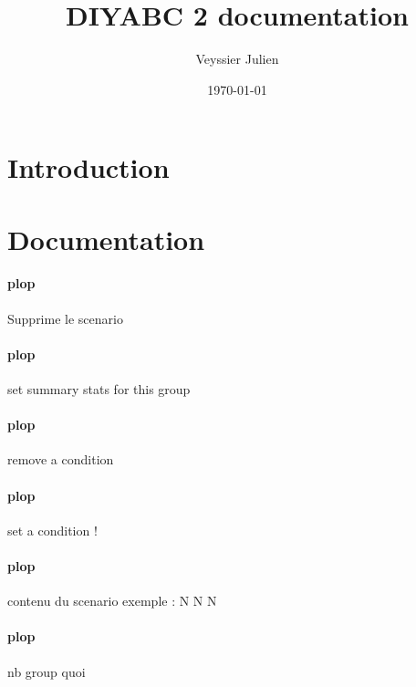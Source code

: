 \documentclass[12pt,a4paper]{article}
\author{Veyssier Julien}
\title{DIYABC 2 documentation}
\date\today
\begin{document}
\maketitle
\newpage

\tableofcontents

\newpage
 

\section{Introduction}

\section{Documentation}
        \paragraph{plop}
        \label{doc_rmScButton}
        Supprime le scenario

        \paragraph{plop}
        \label{doc_setSumButton}
        set summary stats for this group

        \paragraph{plop}
        \label{doc_rmCondButton}
        remove a condition

        \paragraph{plop}
        \label{doc_setCondButton}
        set a condition !

        \paragraph{plop}
        \label{doc_scplainTextEdit}
        contenu du scenario \newline exemple : \newline N N N

        \paragraph{plop}
        \label{doc_nbGroupLabel}
        nb group quoi
\end{document}
